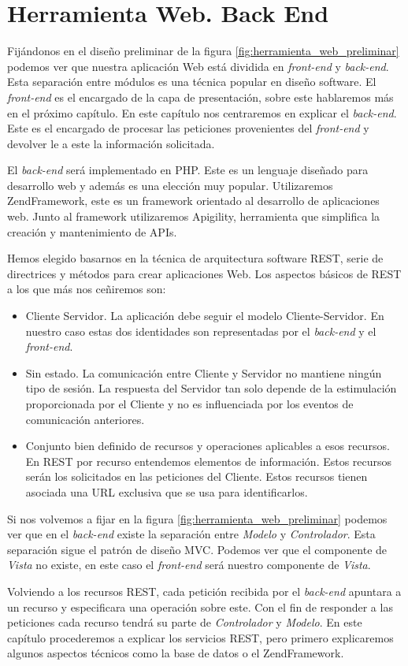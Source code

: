 \chapter{Herramienta Web. Back End}
\label{backend}

Fijándonos en el diseño preliminar de la figura \ref{fig:herramienta_web_preliminar} podemos ver que nuestra aplicación Web está dividida en
\emph{front-end} y \emph{back-end}. Esta separación entre módulos es una técnica popular en diseño software. El \emph{front-end} es el encargado de
la capa de presentación, sobre este hablaremos más en el próximo capítulo. En este capítulo nos centraremos en explicar el \emph{back-end}. Este es el
encargado de procesar las peticiones provenientes del \emph{front-end} y devolver le a este la información solicitada. 
\par
El \emph{back-end} será implementado en PHP\cite{PHP}. Este es un lenguaje diseñado para desarrollo web y además es una elección muy popular. 
Utilizaremos ZendFramework\cite{ZF}, este es un framework orientado al desarrollo de aplicaciones web. Junto al framework utilizaremos 
Apigility\cite{Apigility}, herramienta que simplifica la creación y mantenimiento de APIs.
\par
Hemos elegido basarnos en la técnica de arquitectura software REST\cite{Rest}, serie de directrices y métodos para crear aplicaciones Web. Los
aspectos básicos de REST a los que más nos ceñiremos son:
\begin{itemize}
	\item	Cliente Servidor. La aplicación debe seguir el modelo Cliente-Servidor. En nuestro caso estas dos identidades son representadas por el
	  	\emph{back-end} y el \emph{front-end}.
	\item	Sin estado. La comunicación entre Cliente y Servidor no mantiene ningún tipo de sesión. La respuesta del Servidor tan solo depende de
	  	la estimulación proporcionada por el Cliente y no es influenciada por los eventos de comunicación anteriores.
	\item	Conjunto bien definido de recursos y operaciones aplicables a esos recursos. En REST por recurso entendemos elementos de información.
	  	Estos recursos serán los solicitados en las peticiones del Cliente. Estos recursos tienen asociada una URL exclusiva que se usa para
		identificarlos.
\end{itemize}
Si nos volvemos a fijar en la figura \ref{fig:herramienta_web_preliminar} podemos ver que en el \emph{back-end} existe la separación entre
\emph{Modelo} y \emph{Controlador}. Esta separación sigue el patrón de diseño MVC\cite{MVCWiki}. Podemos ver que el componente de \emph{Vista} no
existe, en este caso el \emph{front-end} será nuestro componente de \emph{Vista}.
\par
Volviendo a los recursos REST, cada petición recibida por el \emph{back-end} apuntara a un recurso y especificara una operación sobre este. Con el fin
de responder a las peticiones cada recurso tendrá su parte de \emph{Controlador} y \emph{Modelo}. En este capítulo procederemos a explicar los
servicios REST, pero primero explicaremos algunos aspectos técnicos como la base de datos o el ZendFramework.
